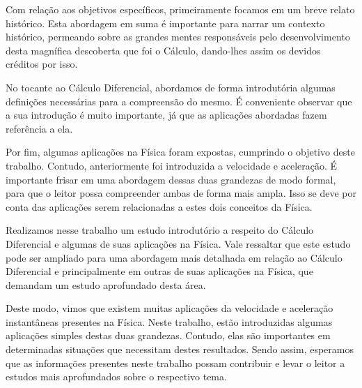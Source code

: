 \documentclass[
	12pt,				%
	openright,			%
    twoside,			%
	a4paper,			%
	chapter=TITLE,		%
	english,			%
	french,				%
	spanish,			%
	brazil				%
	]{abntex2}
\numberwithin{lema}{chapter}
\numberwithin{teorema}{chapter}
\numberwithin{definicao}{chapter}
\numberwithin{exemplo}{chapter}
\numberwithin{figure}{chapter}
\begin{document}
Com relação aos objetivos específicos, primeiramente focamos em um breve relato histórico. Esta abordagem em suma é importante para narrar um contexto histórico, permeando sobre as grandes mentes responsáveis pelo desenvolvimento desta magnífica descoberta que foi o Cálculo, dando-lhes assim os devidos créditos por isso.

No tocante ao Cálculo Diferencial, abordamos de forma introdutória algumas definições necessárias para a compreensão do mesmo. É conveniente observar que a sua introdução é muito importante, já que as aplicações abordadas fazem referência a ela.

Por fim, algumas aplicações na Física foram expostas, cumprindo o objetivo deste trabalho. Contudo, anteriormente foi introduzida a velocidade e aceleração. É importante frisar em uma abordagem dessas duas grandezas de modo formal, para que o leitor possa compreender ambas de forma mais ampla. Isso se deve por conta das aplicações serem relacionadas a estes dois conceitos da Física.

Realizamos nesse trabalho um estudo introdutório a respeito do Cálculo Diferencial e algumas de suas aplicações na Física. Vale ressaltar que este estudo pode ser ampliado para uma abordagem mais detalhada em relação ao Cálculo Diferencial e principalmente em outras de suas aplicações na Física, que demandam um estudo aprofundado desta área. 

Deste modo, vimos que existem muitas aplicações da velocidade e aceleração instantâneas presentes na Física. Neste trabalho, estão introduzidas algumas aplicações simples destas duas grandezas. Contudo, elas são importantes em determinadas situações que necessitam destes resultados. Sendo assim, esperamos que as informações presentes neste trabalho possam contribuir e levar o leitor a estudos mais aprofundados sobre o respectivo tema.





%
%

\printindex[remissivo]
\end{document}
